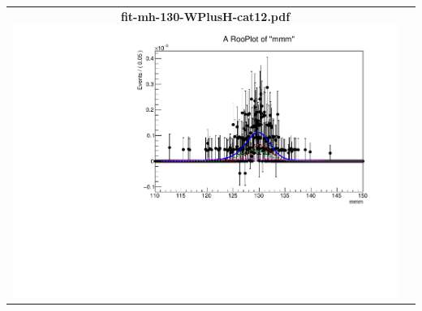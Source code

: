 \begin{longtable}{|c|c|}
{}
 \\
\hline
\parbox{0.49\textwidth}{
\centering
{\bfseries fit-mh-130-WPlusH-cat12.pdf}
\includegraphics[width=.49\textwidth]{figures/signal_model/AppendixBdt/WPlusH/130/fit_mh_130_WPlusH_cat12.pdf}
}
 & \\ \hline
\end{longtable}
